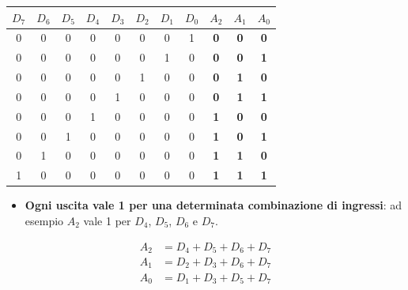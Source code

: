\documentclass[12pt, a4paper]{article}
\begin{document}
\begin{center}
\renewcommand{\arraystretch}{1.25}
\begin{tabular}[t]{|cccccccc||ccc|}
\hline
\colorbox{gray!25}{\color{black}$D_7$} & \colorbox{gray!25}{\color{black}$D_6$} & \colorbox{gray!25}{\color{black}$D_5$} & \colorbox{gray!25}{\color{black}$D_4$} & \colorbox{gray!25}{\color{black}$D_3$} & \colorbox{gray!25}{\color{black}$D_2$} & \colorbox{gray!25}{\color{black}$D_1$} & \colorbox{gray!25}{\color{black}$D_0$} & \colorbox{gray!25}{\color{black}$A_2$} & \colorbox{gray!25}{\color{black}$A_1$} & \colorbox{gray!25}{\color{black}$A_0$} \\ \hline
0 & 0 & 0 & 0 & 0 & 0 & 0 & 1 & \textbf{0} & \textbf{0} & \textbf{0} \\ \hline
0 & 0 & 0 & 0 & 0 & 0 & 1 & 0 & \textbf{0} & \textbf{0} & \textbf{1} \\ \hline
0 & 0 & 0 & 0 & 0 & 1 & 0 & 0 & \textbf{0} & \textbf{1} & \textbf{0} \\ \hline
0 & 0 & 0 & 0 & 1 & 0 & 0 & 0 & \textbf{0} & \textbf{1} & \textbf{1} \\ \hline
0 & 0 & 0 & 1 & 0 & 0 & 0 & 0 & \textbf{1} & \textbf{0} & \textbf{0} \\ \hline
0 & 0 & 1 & 0 & 0 & 0 & 0 & 0 & \textbf{1} & \textbf{0} & \textbf{1} \\ \hline
0 & 1 & 0 & 0 & 0 & 0 & 0 & 0 & \textbf{1} & \textbf{1} & \textbf{0} \\ \hline
1 & 0 & 0 & 0 & 0 & 0 & 0 & 0 & \textbf{1} & \textbf{1} & \textbf{1} \\ \hline
\end{tabular}
\end{center}

\begin{itemize}
    \item \textbf{Ogni uscita vale 1 per una determinata combinazione di ingressi}: ad esempio $A_2$ vale 1 per $D_4$, $D_5$, $D_6$ e $D_7$.
\end{itemize}
\begin{align*}
A_2 &= D_4 + D_5 + D_6 + D_7 \\
A_1 &= D_2 + D_3 + D_6 + D_7 \\
A_0 &= D_1 + D_3 + D_5 + D_7
\end{align*}
\end{document}
